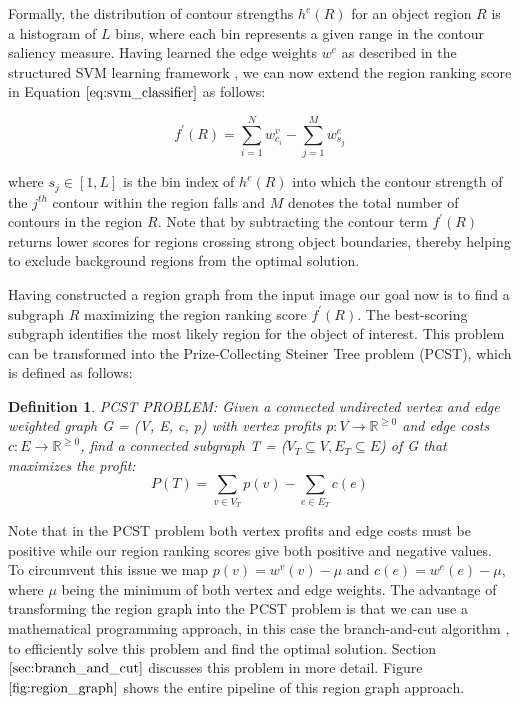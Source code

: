 \documentclass{SMBV13}
\newtheorem{definition}{Definition}
\begin{document}
Formally, the distribution of contour strengths $h^e(R)$ for an object region $R$ is a histogram of $L$ bins, where each bin represents a given range in the contour saliency measure. Having learned the edge weights $w^e$ as described in the structured SVM learning framework \cite{tsochantaridis2006large}, we can now extend the region ranking score in Equation $\ref{eq:svm_classifier}$ as follows:

\begin{equation}
f^{\prime}(R) = \sum\limits_{i = 1}^{N} w^v_{c_i} - \sum\limits_{j = 1}^{M} w^e_{s_j}
\end{equation}

where $s_j \in [1, L]$ is the bin index of $h^e(R)$ into which the contour strength of the $j^{th}$ contour within the region falls and $M$ denotes the total number of contours in the region $R$. Note that by subtracting the contour term $f^{\prime}(R)$ returns lower scores for regions crossing strong object boundaries, thereby helping to exclude background regions from the optimal solution.

Having constructed a region graph from the input image our goal now is to find a subgraph $R$ maximizing the region ranking score $f^\prime(R)$. The best-scoring subgraph identifies the most likely region for the object of interest. This problem can be transformed into the Prize-Collecting Steiner Tree problem (PCST), which is defined as follows:

\begin{definition}
PCST PROBLEM: Given a connected undirected vertex and edge weighted graph G = (V, E, c, p) with vertex profits $p: V \rightarrow \mathbb{R}^{\geq 0}$ and edge costs $c: E \rightarrow \mathbb{R}^{\geq 0}$, find a connected subgraph T = ($V_T \subseteq V, E_T \subseteq E$) of G that maximizes the profit:
\begin{equation}
P(T) = \sum\limits_{v \in V_T} p(v) - \sum\limits_{e \in E_T} c(e)
\end{equation}
\end{definition}

Note that in the PCST problem both vertex profits and edge costs must be positive while our region ranking scores give both positive and negative values. To circumvent this issue we map $p(v) = w^v(v) - \mu$ and $c(e) = w^e(e) - \mu$, where $\mu$ being the minimum of both vertex and edge weights. The advantage of transforming the region graph into the PCST problem is that we can use a mathematical programming approach, in this case the branch-and-cut algorithm \cite{ljubic2006algorithmic}, to efficiently solve this problem and find the optimal solution. Section $\ref{sec:branch_and_cut}$ discusses this problem in more detail. Figure $\ref{fig:region_graph}$ shows the entire pipeline of this region graph approach.
\end{document}
